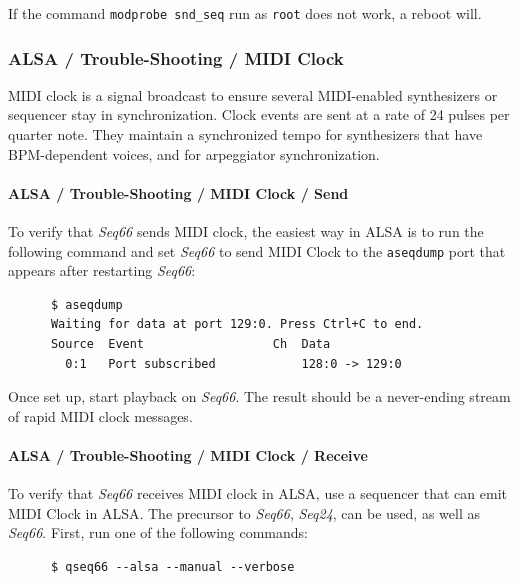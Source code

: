    If the command \texttt{modprobe snd\_seq} run as \texttt{root} does
   not work, a reboot will.

\subsubsection{ALSA / Trouble-Shooting / MIDI Clock}
\label{subsubsec:alsa_testing_midi_clock}

   MIDI clock is a signal broadcast to ensure
   several MIDI-enabled synthesizers or sequencer stay in
   synchronization. Clock events are sent at a rate of 24 pulses per quarter
   note.  They maintain a synchronized tempo for synthesizers
   that have BPM-dependent voices, and for arpeggiator synchronization.

\paragraph{ALSA / Trouble-Shooting / MIDI Clock / Send}
\label{paragraph:alsa_testing_midi_clock_send}

   To verify that \textsl{Seq66} sends MIDI clock, the easiest way in
   ALSA is to run the following command and set \textsl{Seq66} to send
   MIDI Clock to the \texttt{aseqdump} port that appears after restarting
   \textsl{Seq66}:

   \begin{verbatim}
      $ aseqdump
      Waiting for data at port 129:0. Press Ctrl+C to end.
      Source  Event                  Ch  Data
        0:1   Port subscribed            128:0 -> 129:0
   \end{verbatim}

   Once set up, start playback on \textsl{Seq66}.
   The result should be a never-ending stream of rapid MIDI clock messages.

\paragraph{ALSA / Trouble-Shooting / MIDI Clock / Receive}
\label{paragraph:alsa_testing_midi_clock_receive}

   To verify that \textsl{Seq66} receives MIDI clock in ALSA, use a sequencer
   that can emit MIDI Clock in ALSA.  The precursor to \textsl{Seq66},
   \textsl{Seq24}, can be used, as well as \textsl{Seq66}.
   First, run one of the following commands:

   \begin{verbatim}
      $ qseq66 --alsa --manual --verbose
   \end{verbatim}

